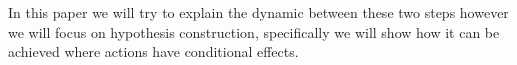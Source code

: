 \documentclass[Master.tex]{subfiles}
\begin{document}
	In this paper we will try to explain the dynamic between these two
	steps however we will focus on hypothesis construction, specifically
	we will show how it can be achieved where actions have conditional
	effects.

%
%
%
%
%
%
%
\end{document}
